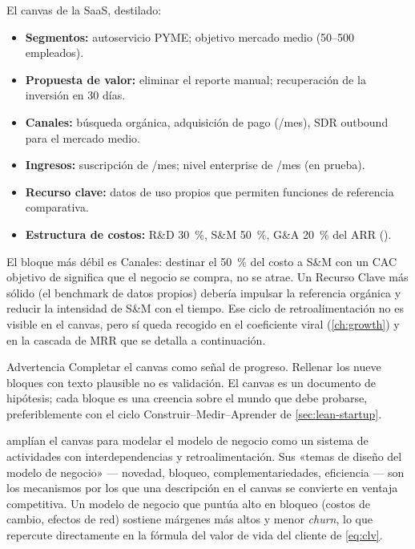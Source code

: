 \begin{example}
El canvas de la SaaS, destilado:
\begin{itemize}
  \item \textbf{Segmentos:} autoservicio PYME; objetivo mercado medio (50--500 empleados).
  \item \textbf{Propuesta de valor:} eliminar el reporte manual; recuperación de la inversión en 30 días.
  \item \textbf{Canales:} búsqueda orgánica, adquisición de pago (/mes), SDR outbound para el mercado medio.
  \item \textbf{Ingresos:} suscripción de /mes; nivel enterprise de /mes (en prueba).
  \item \textbf{Recurso clave:} datos de uso propios que permiten funciones de referencia comparativa.
  \item \textbf{Estructura de costos:} R\&D \qty{30}{\percent}, S\&M \qty{50}{\percent}, G\&A \qty{20}{\percent} del ARR ().
\end{itemize}
El bloque más débil es Canales: destinar el \qty{50}{\percent} del costo a S\&M con un CAC objetivo de  significa que el negocio se compra, no se atrae. Un Recurso Clave más sólido (el benchmark de datos propios) debería impulsar la referencia orgánica y reducir la intensidad de S\&M con el tiempo. Ese ciclo de retroalimentación no es visible en el canvas, pero sí queda recogido en el coeficiente viral (\cref{ch:growth}) y en la cascada de MRR que se detalla a continuación.
\end{example}

\begin{admonition}{Advertencia}
Completar el canvas como señal de progreso. Rellenar los nueve bloques con texto plausible no es validación. El canvas es un documento de hipótesis; cada bloque es una creencia sobre el mundo que debe probarse, preferiblemente con el ciclo Construir--Medir--Aprender de \cref{sec:lean-startup}.
\end{admonition}

\textcite{zott2011business} amplían el canvas para modelar el modelo de negocio como un sistema de actividades con interdependencias y retroalimentación. Sus «temas de diseño del modelo de negocio» --- novedad, bloqueo, complementariedades, eficiencia --- son los mecanismos por los que una descripción en el canvas se convierte en ventaja competitiva. Un modelo de negocio que puntúa alto en bloqueo (costos de cambio, efectos de red) sostiene márgenes más altos y menor \emph{churn}, lo que repercute directamente en la fórmula del valor de vida del cliente de \cref{eq:clv}.

